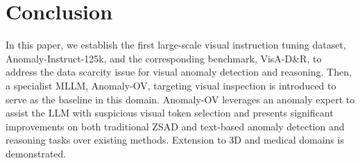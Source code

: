 \section{Conclusion}
In this paper, we establish the first large-scale visual instruction tuning dataset, Anomaly-Instruct-125k, and the corresponding benchmark, VisA-D\&R, to address the data scarcity issue for visual anomaly detection and reasoning. Then, a specialist MLLM, Anomaly-OV, targeting visual inspection is introduced to serve as the baseline in this domain. Anomaly-OV leverages an anomaly expert to assist the LLM with suspicious visual token selection and presents significant improvements on both traditional ZSAD and text-based anomaly detection and reasoning tasks over existing methods. Extension to 3D and medical domains is demonstrated.

